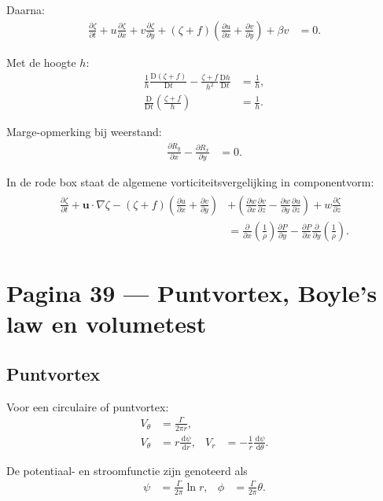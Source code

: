 \documentclass[11pt]{article}
\newcommand{\dd}{\,\mathrm{d}}
\newcommand{\D}{\mathrm{D}}
\newcommand{\pd}[2]{\frac{\partial #1}{\partial #2}}
\newcommand{\td}[2]{\frac{\dd #1}{\dd #2}}
\newcommand{\vect}[1]{\mathbf{#1}}
\begin{document}
Daarna:
\begin{align*}
\pd{\zeta}{t}
+u\pd{\zeta}{x}
+v\pd{\zeta}{y}
+\left(\zeta+f\right)
\left(
\pd{u}{x}
+\pd{v}{y}
\right)
+\beta v
&=
0.
\end{align*}

Met de hoogte $h$:
\begin{align*}
\frac{1}{h}\frac{\D\left(\zeta+f\right)}{\D t}
-\frac{\zeta+f}{h^2}\frac{\D h}{\D t}
&=
\frac{1}{h},
\\
\frac{\D}{\D t}
\left(
\frac{\zeta+f}{h}
\right)
&=
\frac{1}{h}.
\end{align*}

Marge-opmerking bij weerstand:
\begin{align*}
\pd{R_y}{x}
-\pd{R_x}{y}
&=
0.
\end{align*}

In de rode box staat de algemene vorticiteitsvergelijking in componentvorm:
\begin{align*}
\boxed{
\begin{aligned}
\pd{\zeta}{t}
+\vect{u}\cdot\nabla\zeta
-\left(\zeta+f\right)
\left(
\pd{u}{x}
+\pd{v}{y}
\right)
&+
\left(
\pd{w}{x}\pd{v}{z}
-\pd{w}{y}\pd{u}{z}
\right)
+w\pd{\zeta}{z}
\\
&=
\pd{}{x}\left(\frac{1}{\rho}\right)\pd{P}{y}
-
\pd{P}{x}\pd{}{y}\left(\frac{1}{\rho}\right).
\end{aligned}
}
\end{align*}

\newpage

\section*{Pagina 39 --- Puntvortex, Boyle's law en volumetest}

\subsection*{Puntvortex}

Voor een circulaire of puntvortex:
\begin{align*}
V_{\theta}
&=
\frac{\Gamma}{2\pi r},
\\
V_{\theta}
&=
r\td{\psi}{r},
&
V_r
&=
-\frac{1}{r}\td{\psi}{\theta}.
\end{align*}

De potentiaal- en stroomfunctie zijn genoteerd als
\begin{align*}
\psi
&=
\frac{\Gamma}{2\pi}\ln r,
&
\phi
&=
\frac{\Gamma}{2\pi}\theta.
\end{align*}
\end{document}
